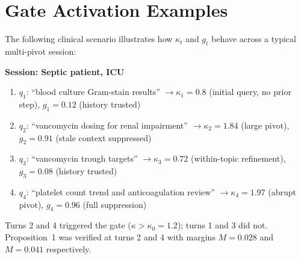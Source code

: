 \documentclass[journal,compsoc]{IEEEtran}
\begin{document}
\section{Gate Activation Examples}
\label{sec:gate_examples}

The following clinical scenario illustrates how $\kappa_t$ and $g_t$ behave
across a typical multi-pivot session:

\medskip
\noindent\textbf{Session: Septic patient, ICU}
\begin{enumerate}
  \item $q_1$: ``blood culture Gram-stain results'' $\to \kappa_1 = 0.8$ (initial
        query, no prior step), $g_1 = 0.12$ (history trusted)
  \item $q_2$: ``vancomycin dosing for renal impairment'' $\to \kappa_2 = 1.84$
        (large pivot), $g_2 = 0.91$ (stale context suppressed)
  \item $q_3$: ``vancomycin trough targets'' $\to \kappa_3 = 0.72$
        (within-topic refinement), $g_3 = 0.08$ (history trusted)
  \item $q_4$: ``platelet count trend and anticoagulation review'' $\to
        \kappa_4 = 1.97$ (abrupt pivot), $g_4 = 0.96$ (full suppression)
\end{enumerate}

Turns 2 and 4 triggered the gate ($\kappa > \kappa_0{=}1.2$); turns 1 and 3 did
not. Proposition~1 was verified at turns 2 and 4 with margins $M = 0.028$ and
$M = 0.041$ respectively.



\end{document}
